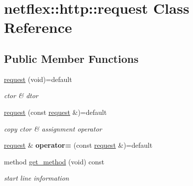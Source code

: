 \hypertarget{classnetflex_1_1http_1_1request}{}\section{netflex\+:\+:http\+:\+:request Class Reference}
\label{classnetflex_1_1http_1_1request}
\subsection*{Public Member Functions}
\begin{DoxyCompactItemize}
\item 
\mbox{\label{classnetflex_1_1http_1_1request_a1c2202c8142807f69cd4bb627af2a3d2}} 
\hyperlink{classnetflex_1_1http_1_1request_a1c2202c8142807f69cd4bb627af2a3d2}{request} (void)=default
\begin{DoxyCompactList}\small\item\em ctor \& dtor \end{DoxyCompactList}\item 
\mbox{\label{classnetflex_1_1http_1_1request_af184b288745bda0dc34aec705ec5807e}} 
\hyperlink{classnetflex_1_1http_1_1request_af184b288745bda0dc34aec705ec5807e}{request} (const \hyperlink{classnetflex_1_1http_1_1request}{request} \&)=default
\begin{DoxyCompactList}\small\item\em copy ctor \& assignment operator \end{DoxyCompactList}\item 
\mbox{\label{classnetflex_1_1http_1_1request_aef5f7d7812a7fb94f85715fcdcf3686f}} 
\hyperlink{classnetflex_1_1http_1_1request}{request} \& {\bfseries operator=} (const \hyperlink{classnetflex_1_1http_1_1request}{request} \&)=default
\item 
\mbox{\label{classnetflex_1_1http_1_1request_a465930c432dc303f6767858e971eda56}} 
method \hyperlink{classnetflex_1_1http_1_1request_a465930c432dc303f6767858e971eda56}{get\+\_\+method} (void) const
\begin{DoxyCompactList}\small\item\em start line information \end{DoxyCompactList}\item 

\end{DoxyCompactItemize}
